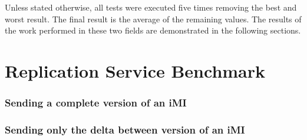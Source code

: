Unless stated otherwise, all tests were executed five times removing the best and worst result. The final result is the average of the remaining values. The results of the work performed in these two fields are demonstrated in the following sections.

\newpage



\section{Replication Service Benchmark}
\label{sec:eval_rep_bench}

\subsubsection{Sending a complete version of an iMI}
\label{susub:eval_iMI_full}

\subsubsection{Sending only the delta between version of an iMI}
\label{susub:eval_iMI_delta}








